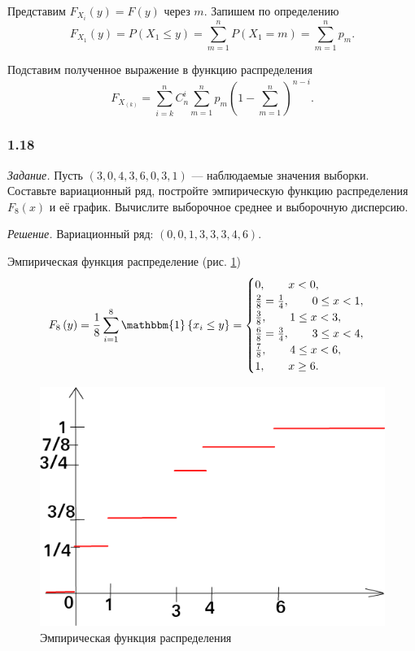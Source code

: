 Представим $F_{X_i} \left( y \right) = F \left( y \right) $ через $m$.
Запишем по определению
$$F_{X_1} \left( y \right) =
  P \left( X_1 \leq y \right) =
  \sum \limits_{m = 1}^n P \left( X_1 = m \right) =
  \sum \limits_{m = 1}^n p_m.$$

Подставим полученное выражение в функцию распределения
$$F_{X_{ \left( k \right) }} =
  \sum \limits_{i = k}^n
    C_n^i \sum \limits_{m = 1}^n p_m \left( 1 - \sum \limits_{m = 1}^n \right)^{n - i}.$$

\subsubsection*{1.18}

\textit{Задание.} Пусть $ \left( 3, 0, 4, 3, 6, 0, 3, 1 \right) $ --- наблюдаемые значения выборки.
Составьте вариационный ряд,
постройте эмпирическую функцию распределения $F_8 \left( x \right) $ и её график.
Вычислите выборочное среднее и выборочную дисперсию.

\textit{Решение.} Вариационный ряд: $ \left( 0, 0, 1, 3, 3, 3, 4, 6 \right) $.

Эмпирическая функция распределение (рис. \ref{fig:118})
$$F_8 \left( y \right) =
  \frac{1}{8} \sum \limits_{i = 1}^8 \mathbbm{1} \left\{ x_i \leq y \right\} =
  \begin{cases}
    0, \qquad x < 0, \\
    \frac{2}{8} = \frac{1}{4}, \qquad 0 \leq x < 1, \\
    \frac{3}{8}, \qquad 1 \leq x < 3, \\
    \frac{6}{8} = \frac{3}{4}, \qquad 3 \leq x < 4, \\
    \frac{7}{8}, \qquad 4 \leq x < 6, \\
    1, \qquad x \geq 6.
  \end{cases}$$

\begin{figure}[h!]
  \centering
  \includegraphics[width=.4\textwidth]{./pictures/1_18.png}
  \caption{Эмпирическая функция распределения}
  \label{fig:118}
\end{figure}

